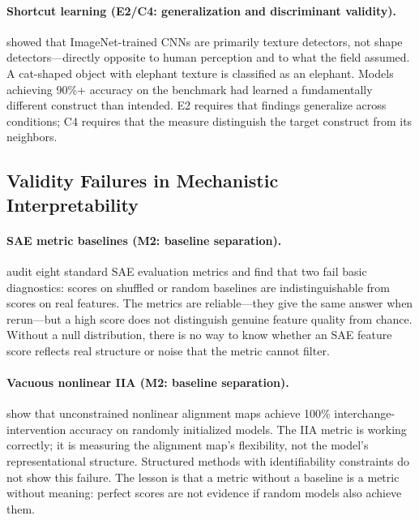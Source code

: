 \documentclass{article}
\begin{document}
\paragraph{Shortcut learning (E2/C4: generalization and discriminant validity).}
\citet{geirhos2019imagenet} showed that ImageNet-trained CNNs are primarily texture detectors, not shape detectors---directly opposite to human perception and to what the field assumed. A cat-shaped object with elephant texture is classified as an elephant. Models achieving 90\%+ accuracy on the benchmark had learned a fundamentally different construct than intended. E2 requires that findings generalize across conditions; C4 requires that the measure distinguish the target construct from its neighbors.

\subsection{Validity Failures in Mechanistic Interpretability}
\label{sec:mi-failures}

\paragraph{SAE metric baselines (M2: baseline separation).}
\citet{karvonen2025saebench} audit eight standard SAE evaluation metrics and find that two fail basic diagnostics: scores on shuffled or random baselines are indistinguishable from scores on real features. The metrics are reliable---they give the same answer when rerun---but a high score does not distinguish genuine feature quality from chance. Without a null distribution, there is no way to know whether an SAE feature score reflects real structure or noise that the metric cannot filter.

\paragraph{Vacuous nonlinear IIA (M2: baseline separation).}
\citet{sutter2025nonlinear} show that unconstrained nonlinear alignment maps achieve 100\% interchange-intervention accuracy on randomly initialized models. The IIA metric is working correctly; it is measuring the alignment map's flexibility, not the model's representational structure. Structured methods with identifiability constraints do not show this failure. The lesson is that a metric without a baseline is a metric without meaning: perfect scores are not evidence if random models also achieve them.
\end{document}
